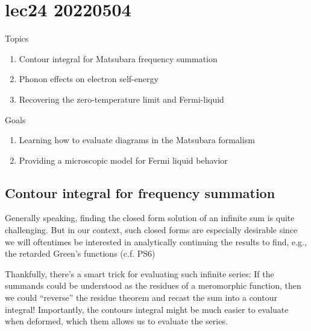 \chapter{lec24 20220504}

Topics

\begin{enumerate}
    \item Contour integral for Matsubara frequency summation
    \item Phonon effects on electron self-energy
    \item Recovering the zero-temperature limit and Fermi-liquid
\end{enumerate}

Goals

\begin{enumerate}
    \item Learning how to evaluate diagrams in the Matsubara formalism
    \item Providing a microscopic model for Fermi liquid behavior
\end{enumerate}

\section{Contour integral for frequency summation}

Generally speaking, finding the closed form solution of an infinite sum is quite challenging. But in our context, such closed forms are especially desirable since we will oftentimes be interested in analytically continuing the results to find, e.g., the retarded Green's functions (c.f. PS6)

Thankfully, there's a smart trick for evaluating such infinite series: If the summands could be understood as the residues of a meromorphic function, then we could ``reverse'' the residue theorem and recast the sum into a contour integral! Importantly, the contours integral might be much easier to evaluate when deformed, which them allows us to evaluate the series.

